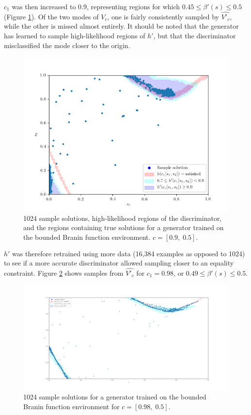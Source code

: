 \documentclass[../../main.tex]{subfiles}
\begin{document}
$c_1$ was then increased to $0.9$, representing regions for which $0.45\le\beta'(s)\le0.5$ (Figure \ref{fig:equality09}).
Of the two modes of $V_c$, one is fairly consistently sampled by $\hat{V'_c}$, while the other is missed almost entirely.
It should be noted that the generator has learned to sample high-likelihood regions of $h'$, but that the discriminator misclassified the mode closer to the origin.
\begin{figure}[H]
    \begin{center}
    \includegraphics[width=\textwidth]{equality09}
    \caption[Samples matching an inaccurate discriminator]{
        1024 sample solutions, high-likelihood regions of the discriminator, and the regions containing true solutions for a generator trained on the bounded Branin function environment.
        $c=[0.9,\;0.5]$.
    }
    \label{fig:equality09}
    \end{center}
\end{figure}
$h'$ was therefore retrained using more data (16,384 examples as opposed to 1024) to see if a more accurate discriminator allowed sampling closer to an equality constraint.
Figure \ref{fig:equality09805} shows samples from $\hat{V'_c}$ for $c_1=0.98$, or $0.49\le\beta'(s)\le0.5$.
\begin{figure}
    \centering
    \includegraphics[width=\textwidth]{equality09805}
    \caption[Samples from a psuedo-equality constraint]{
        1024 sample solutions for a generator trained on the bounded Branin function environment for $c=[0.98,\;0.5]$.
    }
    \label{fig:equality09805}
\end{figure}
\end{document}
